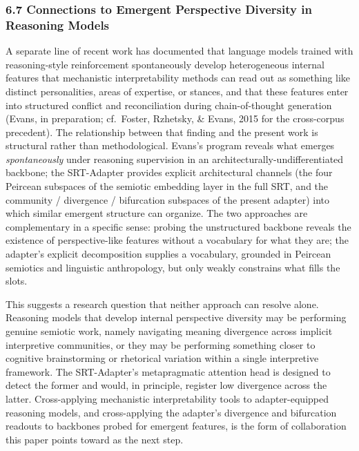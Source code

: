 \documentclass[
  11pt]{article}
\begin{document}
\subsubsection{6.7 Connections to Emergent Perspective Diversity in
Reasoning
Models}\label{connections-to-emergent-perspective-diversity-in-reasoning-models}

A separate line of recent work has documented that language models
trained with reasoning-style reinforcement spontaneously develop
heterogeneous internal features that mechanistic interpretability
methods can read out as something like distinct personalities, areas of
expertise, or stances, and that these features enter into structured
conflict and reconciliation during chain-of-thought generation (Evans,
in preparation; cf.~Foster, Rzhetsky, \& Evans, 2015 for the
cross-corpus precedent). The relationship between that finding and the
present work is structural rather than methodological. Evans's program
reveals what emerges \emph{spontaneously} under reasoning supervision in
an architecturally-undifferentiated backbone; the SRT-Adapter provides
explicit architectural channels (the four Peircean subspaces of the
semiotic embedding layer in the full SRT, and the community / divergence
/ bifurcation subspaces of the present adapter) into which similar
emergent structure can organize. The two approaches are complementary in
a specific sense: probing the unstructured backbone reveals the
existence of perspective-like features without a vocabulary for what
they are; the adapter's explicit decomposition supplies a vocabulary,
grounded in Peircean semiotics and linguistic anthropology, but only
weakly constrains what fills the slots.

This suggests a research question that neither approach can resolve
alone. Reasoning models that develop internal perspective diversity may
be performing genuine semiotic work, namely navigating meaning
divergence across implicit interpretive communities, or they may be
performing something closer to cognitive brainstorming or rhetorical
variation within a single interpretive framework. The SRT-Adapter's
metapragmatic attention head is designed to detect the former and would,
in principle, register low divergence across the latter. Cross-applying
mechanistic interpretability tools to adapter-equipped reasoning models,
and cross-applying the adapter's divergence and bifurcation readouts to
backbones probed for emergent features, is the form of collaboration
this paper points toward as the next step.
\end{document}
